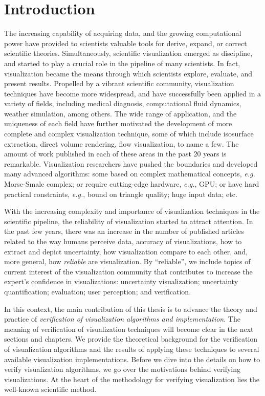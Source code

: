 \chapter{Introduction}

The increasing capability of acquiring data, and the growing computational power have provided to scientists valuable tools for derive, expand, or correct scientific theories. Simultaneously, scientific visualization emerged as discipline, and started to play a crucial role in the pipeline of many scientists. In fact, visualization became the means through which scientists explore, evaluate, and present results. 
%
Propelled by a vibrant scientific community, visualization techniques have become more widespread, and have successfully been applied in a variety of fields, including medical diagnosis, computational fluid dynamics, weather simulation, among others. The wide range of application, and the uniqueness of each field have further motivated the development of more complete and complex visualization technique, some of which include isosurface extraction, direct volume rendering, flow visualization, to name a few.  The amount of work published in each of these areas in the past 20 years is remarkable. Visualization researchers have pushed the boundaries and developed many advanced algorithms: some based on complex mathematical concepts, {\em e.g.} Morse-Smale complex; or require cutting-edge hardware, {\em e.g.}, GPU; or have hard practical constraints, {\em e.g.}, bound on triangle quality; huge input data; etc.

With the increasing complexity and importance of visualization techniques in the scientific pipeline, the reliability of visualization started to attract attention. In the past few years, there was an increase in the number of published articles related to the way humans perceive data, accuracy of visualizations, how to extract and depict uncertainty, how visualization compare to each other, and, more general, how \emph{reliable} are visualization.
%
By ``reliable'', we include topics of current interest of the visualization community that contributes to increase the expert's confidence in visualizations: uncertainty visualization; uncertainty quantification; evaluation; user perception; and verification.

In this context, the main contribution of this thesis is to advance the theory and practice of \emph{verification of visualization algorithms and implementation}.  The meaning of verification of visualization techniques will become clear in the next sections and chapters. We provide the theoretical background for the verification of visualization algorithms and the results of applying these techniques to several available visualization implementations. Before we dive into the details on how to verify visualization algorithms, we go over the motivations behind verifying visualizations. 
At the heart of the methodology for verifying visualization lies the well-known scientific method. 

